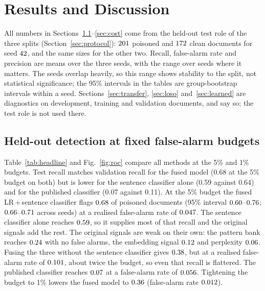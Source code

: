 \section{Results and Discussion}
\label{sec:results}

All numbers in Sections~\ref{sec:heldout}--\ref{sec:cost} come from the held-out
test role of the three splits (Section~\ref{sec:protocol}): $201$ poisoned
and $172$ clean documents for seed $42$, and the same sizes for the
other two. Recall, false-alarm rate and precision are means over the three seeds,
with the range over seeds where it matters. The seeds overlap
heavily, so this range shows stability to the split, not statistical
significance; the 95\% intervals in the tables are group-bootstrap intervals
within a seed. Sections~\ref{sec:transfer}, \ref{sec:loso} and~\ref{sec:learned} are diagnostics on
development, training and validation documents, and say so; the test role is not used there.

\subsection{Held-out detection at fixed false-alarm budgets}
\label{sec:heldout}
Table~\ref{tab:headline} and Fig.~\ref{fig:roc} compare all methods at the 5\%
and 1\% budgets. Test recall matches validation recall for the fused model (0.68
at the 5\% budget on both) but is lower for the sentence classifier alone (0.59
against 0.64) and for the published classifier (0.07 against 0.11).
At the 5\% budget the fused LR\,+\,sentence classifier flags
$0.68$ of poisoned documents (95\% interval
$0.60$--$0.76$; $0.66$--$0.71$
across seeds) at a realised false-alarm rate of $0.047$. The sentence
classifier alone reaches $0.59$, so it supplies most of that recall and
the original signals add the rest.
The original signals are weak on their own:
the pattern bank reaches $0.24$ with no false alarms, the embedding
signal $0.12$ and perplexity $0.06$. Fusing the three
without the sentence classifier gives $0.38$, but at a realised
false-alarm rate of $0.101$, about twice the budget, so even that
recall is flattered. The published
classifier reaches $0.07$ at a false-alarm rate of $0.056$.
Tightening the budget to 1\% lowers the fused model to $0.36$
(false-alarm rate $0.012$).

